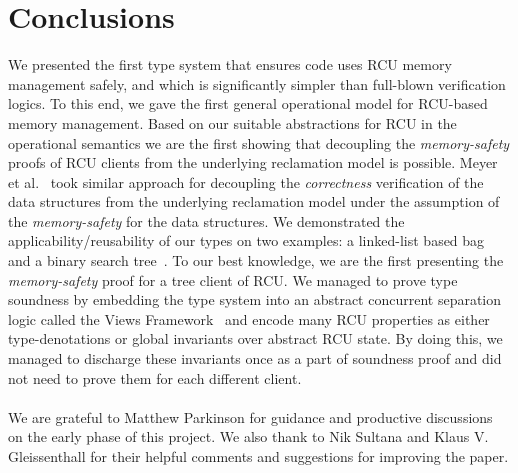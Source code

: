 \section{Conclusions}
\label{sec:concls}
We presented the first type system that ensures code uses RCU memory management safely, and which is significantly simpler than full-blown verification logics. To this end, we gave the first general operational model for RCU-based memory management. Based on our suitable abstractions for RCU in the operational semantics we are the first showing that decoupling the \textit{memory-safety} proofs of RCU clients from the underlying reclamation model is possible. Meyer et al.~\cite{myr} took similar approach for decoupling the \textit{correctness} verification of the data structures from the underlying reclamation model under the assumption of the \textit{memory-safety} for the data structures. We demonstrated the applicability/reusability of our types on two examples: a linked-list based bag~\cite{McKenney2015SomeEO} and a binary search tree~\cite{Arbel:2014:CUR:2611462.2611471}. To our best knowledge, we are the first presenting the \textit{memory-safety} proof for a tree client of RCU. We managed to prove type soundness by embedding the type system into an abstract concurrent separation logic called the Views Framework~\cite{views} and encode many RCU properties as either type-denotations or global invariants over abstract RCU state. By doing this, we managed to discharge these invariants once as a part of soundness proof and did not need to prove them for each different client.
\paragraph{}
 We are grateful to Matthew Parkinson for guidance and productive discussions on the early phase of this project. We also thank to Nik Sultana and Klaus V. Gleissenthall for their helpful comments and suggestions for improving the paper. 
